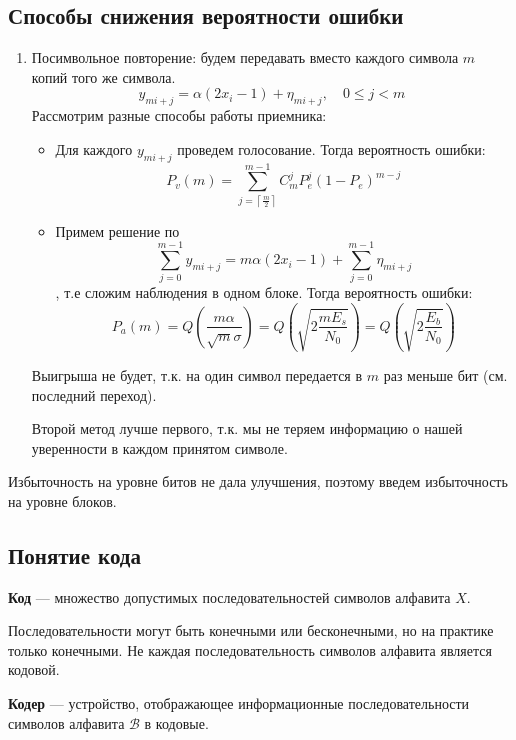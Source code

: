 \subsection{Способы снижения вероятности ошибки}

\begin{enumerate}
    \item Посимвольное повторение: будем передавать вместо каждого символа \(m\) копий того же символа.
        \[y_{mi + j} = \alpha (2x_i - 1) + \eta_{mi + j}, \quad 0 \le j < m\] 
        Рассмотрим разные способы работы приемника:
        \begin{itemize}
            \item  Для каждого \(y_{mi + j}\) проведем голосование. Тогда вероятность ошибки:
        \[P_v(m) = \sum_{j = \left\lceil \frac{m}{2} \right\rceil }^{m - 1} C_m^j P_e^j (1 - P_e)^{m - j}\] 
            \item Примем решение по
                \[\sum_{j = 0}^{m - 1} y_{mi + j} = m \alpha(2 x_i - 1) + \sum_{j = 0}^{m - 1} \eta_{mi + j}\] 
                , т.е сложим наблюдения в одном блоке. Тогда вероятность ошибки:
                \[P_a(m) = Q\left(\frac{m \alpha}{\sqrt{m} \sigma }\right) = Q \left( \sqrt{2 \frac{m E_s}{N_0}} \right) = Q \left( \sqrt{2 \frac{E_b}{N_0}} \right)\] 
        \end{itemize}
        Выигрыша не будет, т.к. на один символ передается в \(m\) раз меньше бит (см. последний переход).

        Второй метод лучше первого, т.к. мы не теряем информацию о нашей уверенности в каждом принятом символе.
\end{enumerate}

Избыточность на уровне битов не дала улучшения, поэтому введем избыточность на уровне блоков.

\subsection{Понятие кода}

\begin{definition}
    \textbf{Код} --- множество допустимых последовательностей символов алфавита \(X\).
\end{definition}

Последовательности могут быть конечными или бесконечными, но на практике только конечными. Не каждая последовательность символов алфавита является кодовой.

\begin{definition}
    \textbf{Кодер} --- устройство, отображающее информационные последовательности символов алфавита \(\mathcal B\) в кодовые.
\end{definition}

